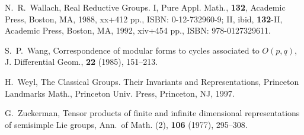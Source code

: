 \begin{thebibliography}{M}
N.~R.~Wallach,
Real Reductive Groups. I,
Pure Appl. Math., {\bf{132}}, Academic Press, Boston, MA, 1988,
xx+412 pp., ISBN: 0-12-732960-9;
II, ibid, {\bf{132}}-II, Academic Press, Boston, MA, 1992,
xiv+454 pp., ISBN: 978-0127329611.

S.~P.~Wang,
Correspondence of modular forms to cycles associated to $O(p,q)$,
J. Differential Geom., {\bf{22}} (1985), 151--213.

H.~Weyl,
The Classical Groups. Their Invariants and Representations,
Princeton Landmarks Math., Princeton Univ. Press, Princeton,
NJ, 1997.

G.~Zuckerman, 
Tensor products of finite and infinite dimensional representations
 of semisimple Lie groups, 
Ann.~of Math. (2),
{\bf{106}} (1977), 295--308.  

\end{thebibliography}
%
